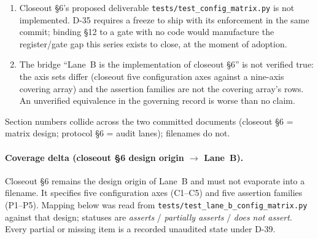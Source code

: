 \documentclass[
  10pt,
]{article}
\providecommand{\tightlist}{%
  \setlength{\itemsep}{0pt}\setlength{\parskip}{0pt}}
\begin{document}
\begin{enumerate}
\tightlist
\item Closeout §6's proposed deliverable \texttt{tests/test\_config\_matrix.py} is not implemented. D-35 requires a freeze to ship with its enforcement in the same commit; binding §12 to a gate with no code would manufacture the register/gate gap this series exists to close, at the moment of adoption.
\item The bridge ``Lane~B is the implementation of closeout §6'' is not verified true: the axis sets differ (closeout five configuration axes against a nine-axis covering array) and the assertion families are not the covering array's rows. An unverified equivalence in the governing record is worse than no claim.
\end{enumerate}

Section numbers collide across the two committed documents (closeout §6 = matrix design; protocol §6 = audit lanes); filenames do not.

\paragraph{Coverage delta (closeout §6 design origin $\rightarrow$ Lane~B).}
Closeout §6 remains the design origin of Lane~B and must not evaporate into a filename. It specifies five configuration axes (C1--C5) and five assertion families (P1--P5). Mapping below was read from \texttt{tests/test\_lane\_b\_config\_matrix.py} against that design; statuses are \emph{asserts} / \emph{partially asserts} / \emph{does not assert}. Every partial or missing item is a recorded unaudited state under D-39.
\end{document}
